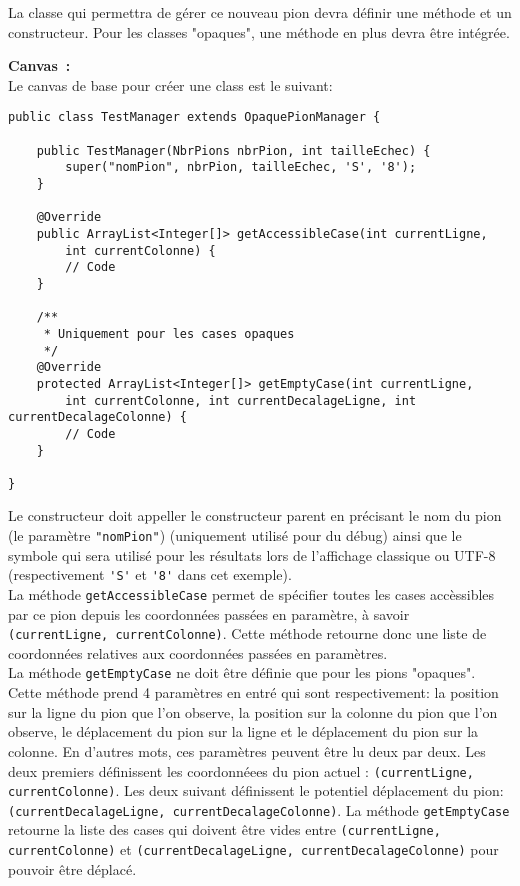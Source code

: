 \documentclass[a4paper,11pt]{article}
\begin{document}
            La classe qui permettra de gérer ce nouveau pion devra définir une méthode et un constructeur. Pour les classes "opaques", une méthode en plus devra être intégrée.

            \textbf{Canvas~:}\\
            Le canvas de base pour créer une class est le suivant:
\begin{verbatim}
public class TestManager extends OpaquePionManager {

    public TestManager(NbrPions nbrPion, int tailleEchec) {
        super("nomPion", nbrPion, tailleEchec, 'S', '8');
    }

    @Override
    public ArrayList<Integer[]> getAccessibleCase(int currentLigne,
        int currentColonne) {
        // Code
    }

    /**
     * Uniquement pour les cases opaques
     */
    @Override
    protected ArrayList<Integer[]> getEmptyCase(int currentLigne, 
        int currentColonne, int currentDecalageLigne, int currentDecalageColonne) {
        // Code
    }

}
\end{verbatim}

            Le constructeur doit appeller le constructeur parent en précisant le nom du pion (le paramètre \verb|"nomPion"|) (uniquement utilisé pour du débug) ainsi que le symbole qui sera utilisé pour les résultats lors de l'affichage classique ou UTF-8 (respectivement \verb|'S'| et \verb|'8'| dans cet exemple).\\

            La méthode \verb|getAccessibleCase| permet de spécifier toutes les cases accèssibles par ce pion depuis les coordonnées passées en paramètre, à savoir \verb|(currentLigne, currentColonne)|.  Cette méthode retourne donc une liste de coordonnées relatives aux coordonnées passées en paramètres.\\

            La méthode \verb|getEmptyCase| ne doit être définie que pour les pions "opaques".  Cette méthode prend 4 paramètres en entré qui sont respectivement: la position sur la ligne du pion que l'on observe, la position sur la colonne du pion que l'on observe, le déplacement du pion sur la ligne et le déplacement du pion sur la colonne. En d'autres mots, ces paramètres peuvent être lu deux par deux.  Les deux premiers définissent les coordonnéees du pion actuel : \verb|(currentLigne, currentColonne)|.  Les deux suivant définissent le potentiel déplacement du pion: \verb|(currentDecalageLigne, currentDecalageColonne)|. La méthode \verb|getEmptyCase| retourne la liste des cases qui doivent être vides entre \verb|(currentLigne, |\\ \verb|currentColonne)| et \verb|(currentDecalageLigne, currentDecalageColonne)| pour pouvoir être déplacé.
\end{document}
